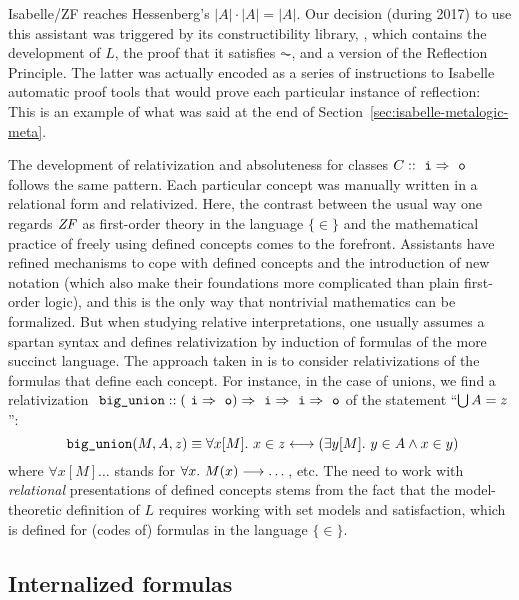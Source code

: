 Isabelle/ZF reaches Hessenberg's $|A|\cdot|A| = |A|$. Our decision
(during 2017) to
use this assistant was triggered by its constructibility
library,  \citep{paulson_2003},
which contains the development of $L$, the proof that it satisfies
$\AC$, and a version of the Reflection Principle. The latter was
actually encoded as a series of instructions to Isabelle automatic
proof tools that would prove each particular instance of reflection:
This is an example of what was said at the end of Section~\ref{sec:isabelle-metalogic-meta}.

The development of relativization and absoluteness for classes $C::
\isatt{i} \fun \isatt{o}$ follows the same pattern. Each particular
concept was manually written in a relational form and relativized.
Here, the contrast between the usual way one regards $\mathit{ZF}$ as
first-order theory in the language $\{\in \}$ and the mathematical
practice of freely using defined concepts comes to the
forefront. Assistants have refined mechanisms to cope with defined
concepts and the introduction of new notation (which also make their foundations more complicated
than plain first-order logic), and this is the only way that nontrivial
mathematics can be formalized. But when studying relative interpretations, one
usually assumes a spartan syntax and defines relativization by
induction of formulas of the more succinct language. The approach
taken in  is to consider relativizations of
the formulas that define each concept. For instance,
in the case of unions, we find a relativization
$\isatt{big{\uscore}union}:: (\isatt{i} \fun \isatt{o}) \fun \isatt{i}
\fun \isatt{i} \fun \isatt{o}$ of the statement
“$\mathop{\textstyle\bigcup} A = z$”:
\[
 \isatt{big{\uscore}union}(M,A,z) \equiv \forall x[M].\ x \in z
 \longleftrightarrow (\exists y[M].\ y \in A \land x \in y)
\]
where $\forall x[M]\dots$ stands for $\forall x.\ M(x)\longrightarrow \dots$,
etc. The need to work with \emph{relational} presentations of defined
concepts stems from the fact that the model-theoretic definition of
$L$ requires working with set models and satisfaction, which is
defined for (codes of) formulas in the language $\{\in\}$.

\subsection{Internalized formulas}
\label{sec:internalized-formulas}

